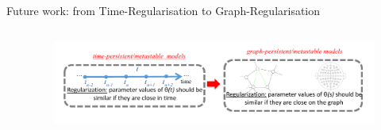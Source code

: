 \documentclass[final,hyperref={pdfpagelabels=false}]{beamer}
\begin{document}
\begin{frame}[t]
\begin{columns}[t]
\begin{column}{.48\textwidth}
\begin{block}{Future work: from Time-Regularisation to Graph-Regularisation}
\begin{columns}[T]
\begin{column}{0.02\linewidth}\end{column}
\begin{column}{0.66\linewidth}
	\begin{figure}[H]
		\begin{center}
			\includegraphics[width=1.0\linewidth, angle=0, clip = true]{figures/graph.pdf}
			\label{fig:graph}	
		\end{center}
	\end{figure}


\end{column}
\end{columns}
\end{block}
\end{column}
\end{columns}
\end{frame}
\end{document}
